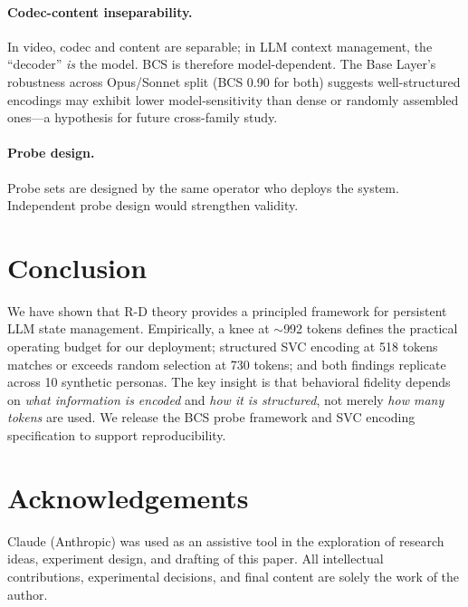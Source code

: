 \documentclass[10pt,twocolumn]{article}
\begin{document}
\paragraph{Codec-content inseparability.}
In video, codec and content are separable; in LLM context management,
the ``decoder'' \emph{is} the model. BCS is therefore model-dependent.
The Base Layer's robustness across Opus/Sonnet split (BCS 0.90 for both)
suggests well-structured encodings may exhibit lower model-sensitivity
than dense or randomly assembled ones—a hypothesis for future
cross-family study.

\paragraph{Probe design.}
Probe sets are designed by the same operator who deploys the system.
Independent probe design would strengthen validity.

\section{Conclusion}

We have shown that R-D theory provides a principled framework for
persistent LLM state management. Empirically, a knee at $\sim$992 tokens
defines the practical operating budget for our deployment; structured
SVC encoding at 518 tokens matches or exceeds random selection at 730
tokens; and both findings replicate across 10 synthetic personas.
The key insight is that behavioral fidelity depends on \emph{what
information is encoded} and \emph{how it is structured}, not merely
\emph{how many tokens} are used. We release the BCS probe framework
and SVC encoding specification to support reproducibility.

\section*{Acknowledgements}

Claude (Anthropic) was used as an assistive tool in the exploration of
research ideas, experiment design, and drafting of this paper.
All intellectual contributions, experimental decisions, and final
content are solely the work of the author.



\end{document}
